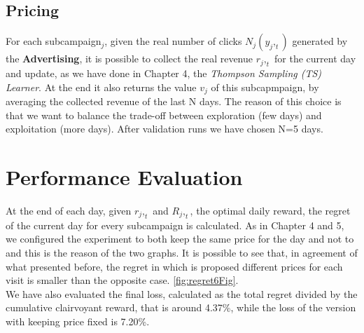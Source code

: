 \subsection{Pricing}
For each subcampaign$_j$, given the real number of clicks $ N_j(y_j,_t) $ generated by the \textbf{Advertising}, it is possible to collect the real revenue $ r_j,_t $ for the current day and update, as we have done in Chapter 4, the \textit{Thompson Sampling (TS) Learner}. At the end it also returns the value $ v_j $ of this subcapmpaign, by averaging the collected revenue of the last N days. The reason of this choice is that we want to balance the trade-off between exploration (few days) and exploitation (more days). After validation runs we have chosen N=5 days.


\section{Performance Evaluation}
At the end of each day, given $ r_j,_t $ and $ R_j,_t $, the optimal daily reward, the regret of the current day for every subcampaign is calculated. As in Chapter 4 and 5, we configured the experiment to both keep the same price for the day and not to and this is the reason of the two graphs. It is possible to see that, in agreement of what presented before, the regret in which is proposed different prices for each visit is smaller than the opposite case. \ref{fig:regret6Fig}.\\
We have also evaluated the final loss, calculated as the total regret divided by the cumulative clairvoyant reward, that is around 4.37\%, while the loss of the version with keeping price fixed is 7.20\%. \\

